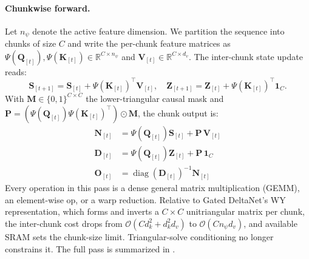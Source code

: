 \documentclass{article}
\newcommand{\1}{\bm{1}}
\newcommand{\diag}{\mathop{\mathrm{diag}}}
\def\vone{{\bm{1}}}
\def\mD{{\bm{D}}}
\def\mK{{\bm{K}}}
\def\mM{{\bm{M}}}
\def\mN{{\bm{N}}}
\def\mO{{\bm{O}}}
\def\mP{{\bm{P}}}
\def\mQ{{\bm{Q}}}
\def\mS{{\bm{S}}}
\def\mV{{\bm{V}}}
\def\mZ{{\bm{Z}}}
\def\gO{{\mathcal{O}}}
\newcommand{\R}{\mathbb{R}}
\theoremstyle{definition}
\begin{document}
\paragraph{Chunkwise forward.} Let $n_\psi$ denote the active feature dimension. We partition the sequence into chunks of size $C$ and write the per-chunk feature matrices as
$\Psi(\mQ_{[t]}),\Psi(\mK_{[t]})\in\R^{C\times n_\psi}$ and $\mV_{[t]}\in\R^{C\times d_v}$. The
inter-chunk state update reads:
\begin{equation}
  \mS_{[t+1]}  = \mS_{[t]} + \Psi(\mK_{[t]})^\top \mV_{[t]},\quad
  \mZ_{[t+1]}  = \mZ_{[t]} + \Psi(\mK_{[t]})^\top \vone_C. \label{eq:chunk-SZ}
\end{equation}
With $\mM\in\{0,1\}^{C\times C}$ the lower-triangular causal mask and
$\mP=(\Psi(\mQ_{[t]})\Psi(\mK_{[t]})^\top)\odot\mM$, the chunk output is:
\begin{align}
  \mN_{[t]} & = \Psi(\mQ_{[t]})\mS_{[t]} + \mP\,\mV_{[t]} \\
  \mD_{[t]} & = \Psi(\mQ_{[t]})\mZ_{[t]} + \mP\,\vone_C   \\
  \mO_{[t]} & = \diag(\mD_{[t]})^{-1}\mN_{[t]}
  \label{eq:chunk-out}
\end{align}
Every operation in this pass is a dense general matrix multiplication (GEMM), an element-wise
op, or a warp reduction. Relative to Gated DeltaNet's WY representation, which forms and
inverts a $C\!\times\!C$ unitriangular
matrix per chunk, the inter-chunk cost drops from $\gO(Cd_k^2 + d_k^2 d_v)$ to $\gO(Cn_\psi d_v)$,
and available SRAM sets the chunk-size limit. Triangular-solve conditioning no longer constrains
it. The full pass is summarized in .
\end{document}
